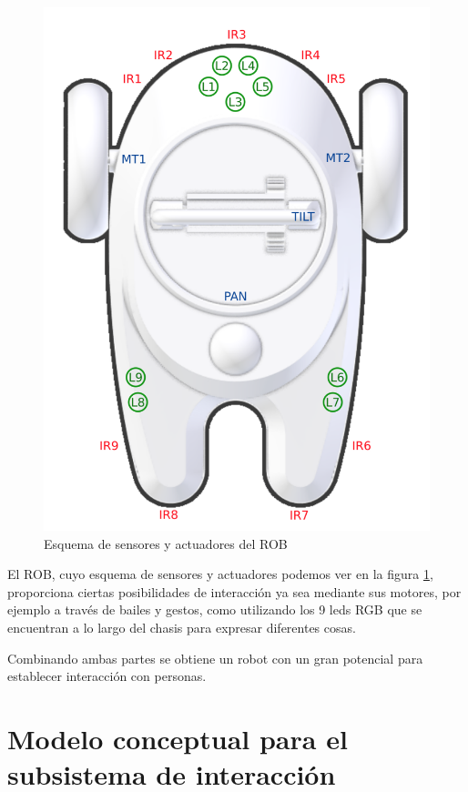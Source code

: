 \begin{figure}[h]
	\centering
	\includegraphics[width=0.4\linewidth]{imagenes/rob_schema.png}
	\caption{Esquema de sensores y actuadores del ROB}
	\label{fig:rob-schema}
\end{figure}
El ROB, cuyo esquema de sensores y actuadores podemos ver en la figura \ref{fig:rob-schema}, proporciona ciertas posibilidades de interacción ya sea mediante sus motores, por ejemplo a través de bailes y gestos, como utilizando los 9 leds RGB que se encuentran a lo largo del chasis para expresar diferentes cosas.

Combinando ambas partes se obtiene un robot con un gran potencial para establecer interacción con personas.




\section{Modelo conceptual para el subsistema de interacción}
 \label{sec:modelo-conceptual}
 
